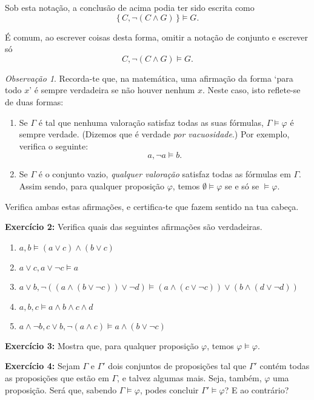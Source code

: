 \documentclass{article}
\theoremstyle{definition}
\theoremstyle{remark}
\newtheorem{obs}{Observação}
\begin{document}
	Sob esta notação, a conclusão de acima podia ter sido escrita como
	\[\{\, C, \neg(C \land G) \,\} \vDash G.\]
	
	É comum, ao escrever coisas desta forma, omitir a notação de conjunto e escrever só
	\[C, \neg(C \land G) \vDash G.\]
	
	\begin{obs}
	Recorda-te que, na matemática, uma afirmação da forma `para todo $x$' é sempre verdadeira se não houver nenhum $x$. Neste caso, isto reflete-se de duas formas:
	
	\begin{enumerate}
	\item Se $\Gamma$ é tal que nenhuma valoração satisfaz todas as suas fórmulas, $\Gamma \vDash \varphi$ é sempre verdade. (Dizemos que é verdade \emph{por vacuosidade}.) Por exemplo, verifica o seguinte:
	\[ a, \neg a \vDash b.\]
	
	\item Se $\Gamma$ é o conjunto vazio, \emph{qualquer valoração} satisfaz todas as fórmulas em $\Gamma$. Assim sendo, para qualquer proposição $\varphi$, temos $\emptyset \vDash \varphi$ se e só se $\vDash \varphi$.
	\end{enumerate}
	
	Verifica ambas estas afirmações, e certifica-te que fazem sentido na tua cabeça.
	\end{obs}
	
	\textbf{Exercício 2:} Verifica quais das seguintes afirmações são verdadeiras.
	
	\begin{enumerate}
	\item $a, b \vDash (a \lor c) \land (b \lor c)$
	
	\item $a \lor c, a \lor \neg c \vDash a$
	
	\item $a \lor b, \neg( (a \land (b \lor \neg c)) \lor \neg d) \vDash (a \land (c \lor \neg c)) \lor (b \land (d \lor \neg d))$
	
	\item $a, b, c \vDash a \land b \land c \land d$
	
	\item $a \land \neg b, c \lor b, \neg(a \land c) \vDash a \land (b \lor \neg c)$
	\end{enumerate}
	
	\textbf{Exercício 3:} Mostra que, para qualquer proposição $\varphi$, temos $\varphi \vDash \varphi$.
	
	\smallskip
	
	\textbf{Exercício 4:} Sejam $\Gamma$ e $\Gamma'$ dois conjuntos de proposições tal que $\Gamma'$ contém todas as proposições que estão em $\Gamma$, e talvez algumas mais. Seja, também, $\varphi$ uma proposição. Será que, sabendo $\Gamma \vDash \varphi$, podes concluir $\Gamma' \vDash \varphi$? E ao contrário?

	\smallskip
	
	
\end{document}
